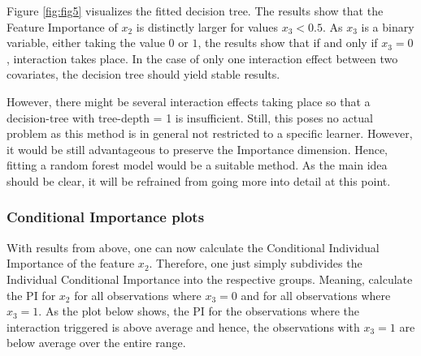 \documentclass[
]{krantz}
\begin{document}
Figure \ref{fig:fig5} visualizes the fitted decision tree. The results show that the Feature Importance of \(x_2\) is distinctly larger for values \(x_3 < 0.5\). As \(x_3\) is a binary variable, either taking the value \(0\) or \(1\), the results show that if and only if \(x_3 = 0\), interaction takes place. In the case of only one interaction effect between two covariates, the decision tree should yield stable results.

However, there might be several interaction effects taking place so that a decision-tree with tree-depth = 1 is insufficient. Still, this poses no actual problem as this method is in general not restricted to a specific learner. However, it would be still advantageous to preserve the Importance dimension. Hence, fitting a random forest model would be a suitable method. As the main idea should be clear, it will be refrained from going more into detail at this point.

\hypertarget{ch322}{%
\subsubsection{Conditional Importance plots}\label{ch322}}

With results from above, one can now calculate the Conditional Individual Importance of the feature \(x_{2}\). Therefore, one just simply subdivides the Individual Conditional Importance into the respective groups. Meaning, calculate the PI for \(x_2\) for all observations where \(x_3 = 0\) and for all observations where \(x_3 = 1\). As the plot below shows, the PI for the observations where the interaction triggered is above average and hence, the observations with \(x_3 = 1\) are below average over the entire range.
\end{document}
